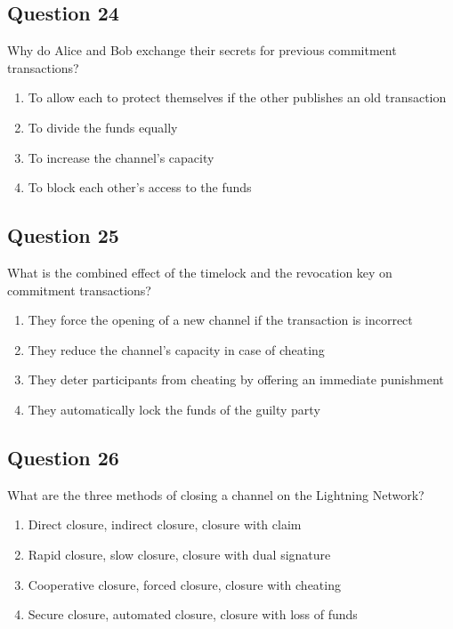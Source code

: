 \documentclass[12pt,a4paper]{article}
\begin{document}
\bigskip


\subsection*{Question 24}
Why do Alice and Bob exchange their secrets for previous commitment transactions?

\begin{enumerate}[label=\Alph*., leftmargin=*]
\item To allow each to protect themselves if the other publishes an old transaction
\item To divide the funds equally
\item To increase the channel's capacity
\item To block each other's access to the funds
\end{enumerate}

\bigskip


\subsection*{Question 25}
What is the combined effect of the timelock and the revocation key on commitment transactions?

\begin{enumerate}[label=\Alph*., leftmargin=*]
\item They force the opening of a new channel if the transaction is incorrect
\item They reduce the channel's capacity in case of cheating
\item They deter participants from cheating by offering an immediate punishment
\item They automatically lock the funds of the guilty party
\end{enumerate}

\bigskip


\subsection*{Question 26}
What are the three methods of closing a channel on the Lightning Network?

\begin{enumerate}[label=\Alph*., leftmargin=*]
\item Direct closure, indirect closure, closure with claim
\item Rapid closure, slow closure, closure with dual signature
\item Cooperative closure, forced closure, closure with cheating
\item Secure closure, automated closure, closure with loss of funds
\end{enumerate}
\end{document}

